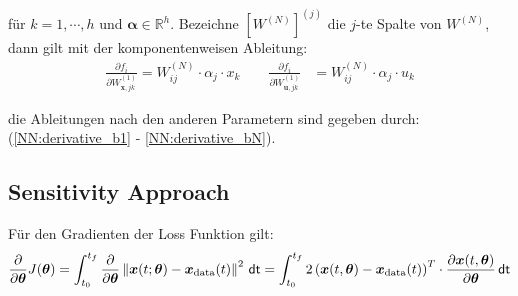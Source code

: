 \documentclass[a4paper, 12pt]{scrartcl}
\newcommand{\norm}[1]{\left\lVert#1\right\lVert}
\newcommand{\dt}{\thinspace \mathsf{dt}}
\begin{document}
für $k=1,\cdots , h$ und $\bm{\alpha} \in \mathbb{R}^h$. 
Bezeichne $\left[W^{(N)}\right]^{(j)}$ die $j$-te Spalte von $W^{(N)}$, 
dann gilt mit der komponentenweisen Ableitung:
%
\begin{align}\label{dynamics:f_W1}
    \frac{\partial f_i}{\partial W_{\bm{x}, j k}^{(1)}}
    =
    W_{ij}^{(N)} 
    \cdot 
    \alpha_{j}
    \cdot 
    x_k
    \qquad
    \frac{\partial f_i}{\partial W_{\bm{u}, j k}^{(1)}}
    &=
    W_{i j}^{(N)} 
    \cdot 
    \alpha_{j}
    \cdot 
    u_k
\end{align}

die Ableitungen nach den anderen Parametern sind gegeben durch: 
(\ref{NN:derivative_b1} - \ref{NN:derivative_bN}).

\subsection{Sensitivity Approach}

%
Für den Gradienten der Loss Funktion gilt:
\begin{align*}
    \frac{\partial}{\partial \bm{\theta}} J(\bm{\theta}) 
    =
    \int_{t_0}^{t_f}
    \frac{\partial}{\partial \bm{\theta}} 
    \norm{\bm{x}(t;\bm{\theta}) - \bm{x}_{\text{data}}(t)}^2 \dt
    =
    \int_{t_0}^{t_f}
    2 \left(\bm{x}(t,\bm{\theta}) - \bm{x}_{\text{data}}(t)\right)^T 
    \cdot 
    \frac{\partial \bm{x}(t,\bm{\theta})}{\partial \bm{\theta}} \dt
\end{align*}
\end{document}
